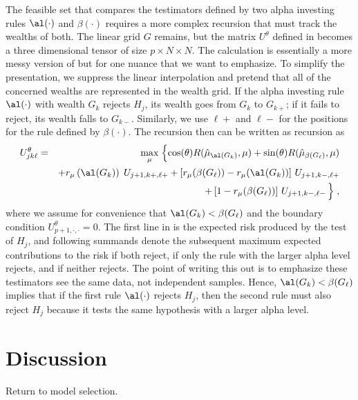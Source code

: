 \documentclass[12pt]{article}
\begin{document}
 The feasible set that compares the testimators defined by two alpha investing
 rules $\al(\cdot)$ and $\beta(\cdot)$ requires a more complex recursion that
 must track the wealths of both.  The linear grid $G$ remains, but the matrix
 $U^\theta$ defined in  becomes a three dimensional tensor of size
 $p \times N \times N$.  The calculation is essentially a more messy version of
  but for one nuance that we want to emphasize.  To simplify the
 presentation, we suppress the linear interpolation and pretend that all of the
 concerned wealths are represented in the wealth grid.  If the alpha investing
 rule $\al(\cdot)$ with wealth $G_k$ rejects $H_j$, its wealth goes from $G_k$
 to $G_{k+}$; if it fails to reject, its wealth falls to $G_{k-}$.
  Similarly, we use $\ell+$ and $\ell-$ for the positions for the rule defined
 by $\beta(\cdot)$.  The recursion then can be written as recursion as
 \begin{eqnarray}
   U^\theta_{jk\ell} &=&  \max_\mu \;\Bigl\{
     \cos(\theta) R(\hat\mu_{\al(G_k)}, \mu) 
       + \sin(\theta) R(\hat\mu_{\beta(G_\ell)},\mu) \cr
     & & + r_\mu\left(\al(G_k)\right) \; U_{j+1,k+,\ell+} 
         + \left[ r_\mu(\beta(G_\ell)) - r_\mu(\al(G_k)) \right] \, U_{j+1,k-,\ell+} \cr
     & & + \left[1-r_\mu(\beta(G_\ell))\right] \, U_{j+1,k-,\ell-} \, \Bigr\}\;,
 \label{eq:Ujkl}
 \end{eqnarray}
 where we assume for convenience that $\al(G_k) < \beta(G_\ell)$ and the
 boundary condition $U_{p+1,\cdot,\cdot}^\theta= 0$.  The first line in
  is the expected risk produced by the test of $H_j$, and following
 summands denote the subsequent maximum expected contributions to the risk if
 both reject, if only the rule with the larger alpha level rejects, and if
 neither rejects.  The point of writing this out is to emphasize these
 testimators see the same data, not independent samples.  Hence, $\al(G_k) <
 \beta(G_\ell)$ implies that if the first rule $\al(\cdot)$ rejects $H_j$, then
 the second rule must also reject $H_j$ because it tests the same hypothesis
 with a larger alpha level.  


\section{ Discussion }


 Return to model selection.
\end{document}
